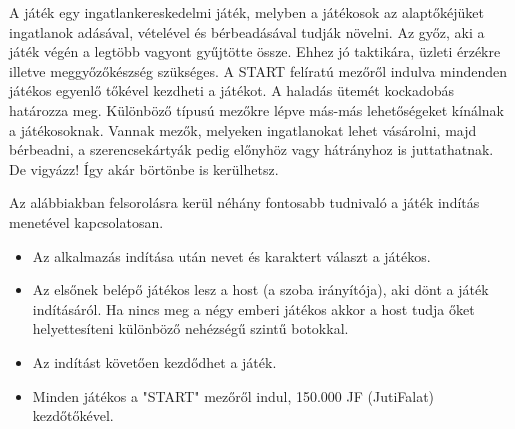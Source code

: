 

A játék egy ingatlankereskedelmi játék, melyben a játékosok az alaptőkéjüket ingatlanok adásával, vételével és bérbeadásával tudják növelni. Az győz, aki a játék végén a legtöbb vagyont gyűjtötte össze. Ehhez jó taktikára, üzleti érzékre illetve meggyőzőkészség szükséges. A START felíratú mezőről indulva mindenden játékos egyenlő tőkével kezdheti a játékot. A haladás ütemét kockadobás határozza meg. Különböző típusú mezőkre lépve más-más lehetőségeket kínálnak a játékosoknak. Vannak mezők, melyeken ingatlanokat lehet vásárolni, majd bérbeadni, a szerencsekártyák pedig előnyhöz vagy hátrányhoz is juttathatnak. De vigyázz! Így akár börtönbe is kerülhetsz. 


Az alábbiakban felsorolásra kerül néhány fontosabb tudnivaló a játék indítás menetével kapcsolatosan.

\begin{itemize}
\item Az alkalmazás indítása után nevet és karaktert választ a játékos.
\item Az elsőnek belépő játékos lesz a host (a szoba irányítója), aki dönt a játék indításáról. Ha nincs meg a négy emberi játékos akkor a host tudja őket helyettesíteni különböző nehézségű szintű botokkal.
\item Az indítást követően kezdődhet a játék.
\item Minden játékos a "START" mezőről indul, 150.000 JF (JutiFalat) kezdőtőkével.
\end{itemize}


